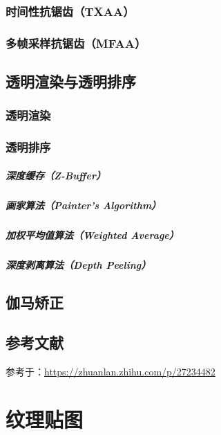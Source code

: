 \documentclass[UTF8,a4paper,12pt]{ctexbook}
\begin{document}
		\subsection{时间性抗锯齿（TXAA）}
		
		\subsection{多帧采样抗锯齿（MFAA）}
		
	\section{透明渲染与透明排序}
		\subsection{透明渲染}
		
		\subsection{透明排序}
			\paragraph{深度缓存（Z-Buffer）}
			
			\paragraph{画家算法（Painter's Algorithm）}
			
			\paragraph{加权平均值算法（Weighted Average）}
			
			\paragraph{深度剥离算法（Depth Peeling）}

	\section{伽马矫正}
	
	\section{参考文献}
			参考于：\url{https://zhuanlan.zhihu.com/p/27234482}
			
\chapter{纹理贴图}
\end{document}
